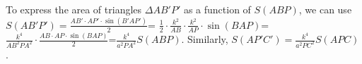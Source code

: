 \documentclass[12pt]{article}
\begin{document}
To express the area of triangles $\Delta AB'P'$ as a function of $S(ABP)$, we can use $S(AB'P')=\frac {AB'\cdot AP' \cdot \sin(B'AP')}{2}$=
$\frac{1}{2} \cdot \frac {k^2} {AB} \cdot \frac {k^2}{AP} \cdot \sin(BAP)$=$\frac {k^4} {AB^2 PA^2} \cdot \frac {AB \cdot AP \cdot \sin(BAP)} {2}$=$\frac {k^4}{a^2 PA^2} S(ABP)$. Similarly, $S(AP'C')=\frac {k^4}{a^2 PC^2} S(APC)$. 
\end{document}

